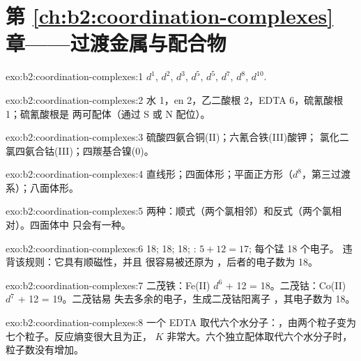 \section*{第 \ref{ch:b2:coordination-complexes} 章——过渡金属与配合物}

\begin{solution}{exo:b2:coordination-complexes:1}
 $d^1$,  $d^2$,  $d^3$,  $d^5$,  $d^5$, 
$d^7$,  $d^8$,  $d^{10}$.
\end{solution}

\begin{solution}{exo:b2:coordination-complexes:2}
水 1，en 2，乙二酸根 2，EDTA 6，硫氰酸根 1；硫氰酸根是
两可配体（通过 S 或 N 配位）。
\end{solution}

\begin{solution}{exo:b2:coordination-complexes:3}
硫酸四氨合铜(II)；六氰合铁(III)酸钾；
氯化二氯四氨合钴(III)；四羰基合镍(0)。
\end{solution}

\begin{solution}{exo:b2:coordination-complexes:4}
直线形；四面体形；平面正方形（$d^8$，第三过渡系）；八面体形。
\end{solution}

\begin{solution}{exo:b2:coordination-complexes:5}
两种：顺式（两个氯相邻）和反式（两个氯相对）。四面体中
只会有一种。
\end{solution}

\begin{solution}{exo:b2:coordination-complexes:6}
 18;  18;  18; : $5 + 12 = 17$;
 每个锰 18 个电子。 违背该规则：它具有顺磁性，并且
很容易被还原为 \ce{[V(CO)6]-}，后者的电子数为 18。
\end{solution}

\begin{solution}{exo:b2:coordination-complexes:7}
二茂铁：Fe(II) $d^6$ + 12 = 18。二茂钴：Co(II) $d^7$ + 12 = 19。二茂钴易
失去多余的电子，生成二茂钴阳离子 \ce{[Co(C5H5)2]+}，其电子数为 18。
\end{solution}

\begin{solution}{exo:b2:coordination-complexes:8}
一个 EDTA 取代六个水分子：，由两个粒子变为七个粒子。反应熵变很大且为正，
$K$ 非常大。六个独立配体取代六个水分子时，
粒子数没有增加。
\end{solution}

